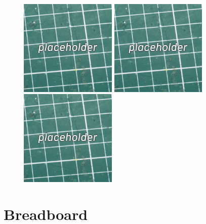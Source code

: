 \documentclass[12pt, a4paper]{article}
\begin{document}
\begin{figure}[H]
    \centering
    \includegraphics[width=46mm]{images/placeholder.jpg}
    \hspace{2mm}
    \includegraphics[width=46mm]{images/placeholder.jpg}
    \hspace{2mm}
    \includegraphics[width=46mm]{images/placeholder.jpg}
\end{figure}

\pagebreak
\section{Breadboard}
\end{document}
